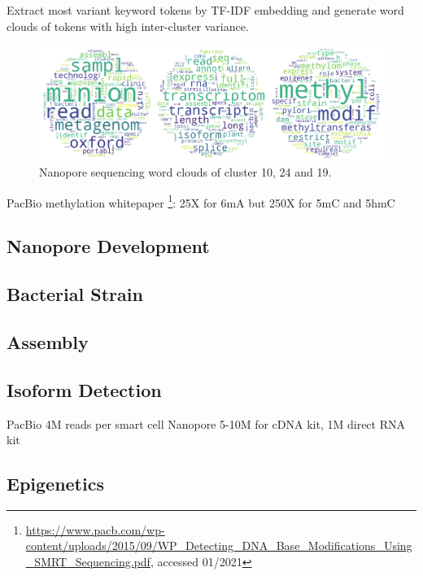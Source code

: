 Extract most variant keyword tokens by TF-IDF embedding and generate word clouds of tokens with high inter-cluster variance.

\begin{figure}[h]
	\centering
	\includegraphics[width=1.0\textwidth]{figures/state_of_art/wcs_minion.pdf}
	\captionsetup{format=plain}
	\caption[Nanopore Sequencing Wordclouds]{Nanopore sequencing word clouds of cluster 10, 24 and 19.}
	\label{fig:state_of_art:wcs_minion}
\end{figure}

PacBio methylation whitepaper \footnote{\url{https://www.pacb.com/wp-content/uploads/2015/09/WP_Detecting_DNA_Base_Modifications_Using_SMRT_Sequencing.pdf}, accessed 01/2021}:
25X for 6mA but 250X for 5mC and 5hmC


\subsection{Nanopore Development}
\label{subsec:state_of_art:nanopore}

\subsection{Bacterial Strain}
\label{subsec:state_of_art:strain}

\subsection{Assembly}
\label{subsec:state_of_art:assembly}

\subsection{Isoform Detection}
\label{subsec:state_of_art:isoform}

PacBio 4M reads per smart cell
Nanopore 5-10M for cDNA kit, 1M direct RNA kit

\subsection{Epigenetics}
\label{subsec:state_of_art:epigenetics}




